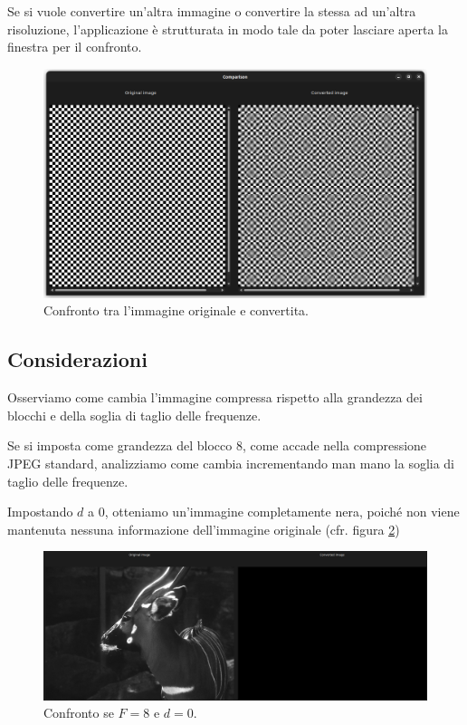 \documentclass[12pt]{article}
\begin{document}
Se si vuole convertire un'altra immagine o convertire la stessa ad un'altra risoluzione, l'applicazione è strutturata in modo tale da poter lasciare aperta la finestra per il confronto.

\begin{figure}[!ht]
    \begin{center}
    \includegraphics[width=\textwidth]{images/comparison.png}
    \caption{Confronto tra l'immagine originale e convertita.}
    \label{fig:comp}
    \end{center}
\end{figure}

\subsection{Considerazioni}

Osserviamo come cambia l'immagine compressa rispetto alla grandezza dei blocchi e della soglia di taglio delle frequenze.

Se si imposta come grandezza del blocco 8, come accade nella compressione JPEG standard, analizziamo come cambia incrementando man mano la soglia di taglio delle frequenze.

Impostando $d$ a 0, otteniamo un'immagine completamente nera, poiché non viene mantenuta nessuna informazione dell'immagine originale (cfr. figura \ref{fig:d80})

\begin{figure}[!ht]
    \begin{center}
    \includegraphics[width=\textwidth]{images/deer-8-0.png}
    \caption{Confronto se $F=8$ e $d=0$.}
    \label{fig:d80}
    \end{center}
\end{figure}
\end{document}
